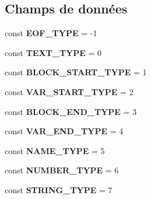 \subsection*{Champs de données}
\begin{DoxyCompactItemize}
\item 
const {\bfseries E\+O\+F\+\_\+\+T\+Y\+PE} = -\/1\hypertarget{class_twig___token_a8568089262d18bfd0fb76f3d783b15f0}{}\label{class_twig___token_a8568089262d18bfd0fb76f3d783b15f0}

\item 
const {\bfseries T\+E\+X\+T\+\_\+\+T\+Y\+PE} = 0\hypertarget{class_twig___token_aa60308f9919cac81f3d6d8f0c61a1b7e}{}\label{class_twig___token_aa60308f9919cac81f3d6d8f0c61a1b7e}

\item 
const {\bfseries B\+L\+O\+C\+K\+\_\+\+S\+T\+A\+R\+T\+\_\+\+T\+Y\+PE} = 1\hypertarget{class_twig___token_aabd9adcf26fada59ef8f5a0be748f1c5}{}\label{class_twig___token_aabd9adcf26fada59ef8f5a0be748f1c5}

\item 
const {\bfseries V\+A\+R\+\_\+\+S\+T\+A\+R\+T\+\_\+\+T\+Y\+PE} = 2\hypertarget{class_twig___token_a20be04a5646a40886dfa4b824f2f43f6}{}\label{class_twig___token_a20be04a5646a40886dfa4b824f2f43f6}

\item 
const {\bfseries B\+L\+O\+C\+K\+\_\+\+E\+N\+D\+\_\+\+T\+Y\+PE} = 3\hypertarget{class_twig___token_af7d3a5dbc1cdaae75625ef1383029251}{}\label{class_twig___token_af7d3a5dbc1cdaae75625ef1383029251}

\item 
const {\bfseries V\+A\+R\+\_\+\+E\+N\+D\+\_\+\+T\+Y\+PE} = 4\hypertarget{class_twig___token_a90edfcf33c8637deddaa97a0f89d7f1e}{}\label{class_twig___token_a90edfcf33c8637deddaa97a0f89d7f1e}

\item 
const {\bfseries N\+A\+M\+E\+\_\+\+T\+Y\+PE} = 5\hypertarget{class_twig___token_a5dde6b9e81eb5c8dd046842570c5dab4}{}\label{class_twig___token_a5dde6b9e81eb5c8dd046842570c5dab4}

\item 
const {\bfseries N\+U\+M\+B\+E\+R\+\_\+\+T\+Y\+PE} = 6\hypertarget{class_twig___token_a0053ba5957db87c3549cd18418ddc7ec}{}\label{class_twig___token_a0053ba5957db87c3549cd18418ddc7ec}

\item 
const {\bfseries S\+T\+R\+I\+N\+G\+\_\+\+T\+Y\+PE} = 7\hypertarget{class_twig___token_a8f9407ce6f57b891a8bd3dc9a2614cb5}{}\label{class_twig___token_a8f9407ce6f57b891a8bd3dc9a2614cb5}


\end{DoxyCompactItemize}

